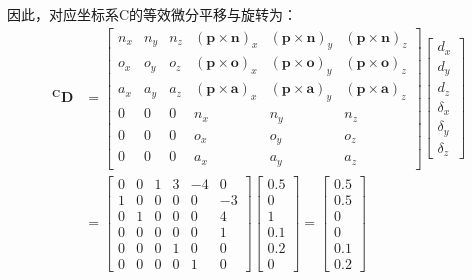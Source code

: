\documentclass{ctexart}
\begin{document}
因此，对应坐标系C的等效微分平移与旋转为：
\begin{equation}
	\begin{aligned}
		\mathbf{^CD} &= \begin{bmatrix} 
			n_x & n_y & n_z & (\mathbf{p} \times \mathbf{n})_x & (\mathbf{p} \times \mathbf{n})_y & (\mathbf{p} \times \mathbf{n})_z \\
			o_x & o_y & o_z & (\mathbf{p} \times \mathbf{o})_x & (\mathbf{p} \times \mathbf{o})_y & (\mathbf{p} \times \mathbf{o})_z \\
			a_x & a_y & a_z & (\mathbf{p} \times \mathbf{a})_x & (\mathbf{p} \times \mathbf{a})_y & (\mathbf{p} \times \mathbf{a})_z \\
			0 & 0 & 0 & n_x & n_y & n_z \\
			0 & 0 & 0 & o_x & o_y & o_z \\
			0 & 0 & 0 & a_x & a_y & a_z
		\end{bmatrix}
		\begin{bmatrix}
			d_x \\ d_y \\ d_z \\ \delta_x \\ \delta_y \\ \delta_z
		\end{bmatrix}\\
		&= \begin{bmatrix}
			0 & 0 & 1 & 3 & -4 & 0 \\
			1 & 0 & 0 & 0 & 0 & -3 \\
			0 & 1 & 0 & 0 & 0 & 4 \\
			0 & 0 & 0 & 0 & 0 & 1 \\
			0 & 0 & 0 & 1 & 0 & 0 \\
			0 & 0 & 0 & 0 & 1 & 0
		\end{bmatrix}
		\begin{bmatrix}
			0.5 \\ 0 \\ 1 \\ 0.1 \\ 0.2 \\ 0
		\end{bmatrix}
		= \begin{bmatrix}
			0.5 \\ 0.5 \\ 0 \\ 0 \\ 0.1 \\ 0.2
		\end{bmatrix}
	\end{aligned}
\end{equation}
\end{document}
